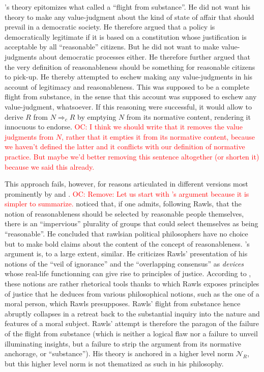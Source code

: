 \documentclass[preprint, french, english, 11pt, authoryear]{elsarticle}%
\newcommand{\commentOC}[1]{\textcolor{red}{OC: #1}}
\begin{document}
\cite{rawls_political_2005}'s theory epitomizes what \cite{estlund_democratic_2009} called a ``flight from substance''. He did not want his theory to make any value-judgment about the kind of state of affair that should prevail in a democratic society. He therefore argued that a policy is democratically legitimate if it is based on a constitution whose justification is acceptable by all  ``reasonable'' citizens. But he did not want to make value-judgments about democratic processes either. He therefore further argued that the very definition of reasonableness should be something for reasonable citizens to pick-up. He thereby attempted to eschew making any value-judgments in his account of legitimacy and reasonableness. This was supposed to be a complete flight from substance, in the sense that this account was supposed to eschew any value-judgment, whatsoever. If this reasoning were successful, it would allow to derive $R$ from $N ⇒_c R$ by emptying $N$ from its normative content, rendering it innocuous to endorse.
\commentOC{I think we should write that it removes the value judgments from $N$, rather that it empties it from its normative content, because we haven’t defined the latter and it conflicts with our definition of normative practice. But maybe we’d better removing this sentence altogether (or shorten it) because we said this already.}

This approach fails, however, for reasons articulated in different versions most prominently by \cite{habermas_reconciliation_1995} and \cite{estlund_democratic_2009}. \commentOC{Remove: Let us start with \cite{estlund_democratic_2009}'s argument because it is simpler to summarize.} \citet{estlund_democratic_2009} noticed that, if one admits, following Rawls, that the notion of reasonableness should be selected by reasonable people themselves, there is an ``impervious'' plurality of groups that could select themselves as being ``reasonable''. He concluded that rawlsian political philosophers have no choice but to make bold claims about the content of the concept of reasonableness. \cite{habermas_reconciliation_1995}'s argument is, to a large extent, similar. He criticizes Rawls' presentation of his notions of the ``veil of ignorance'' and the ``overlapping consensus'' as \emph{devices} whose real-life functionning can give rise to principles of justice. According to \cite{habermas_reconciliation_1995}, these notions are rather rhetorical tools thanks to which Rawls exposes principles of justice that he deduces from various philosophical notions, such as the one of a moral person, which Rawls presupposes. Rawls' flight from substance hence abruptly collapses in a retreat back to the substantial inquiry into the nature and features of a moral subject.  Rawls' attempt is therefore the paragon of the failure of the flight from substance (which is neither a logical flaw nor a failure to unveil illuminating insights, but a failure to strip the argument from its normative anchorage, or ``substance''). His theory is anchored in a higher level norm $\mathscr{N}_R$, but this higher level norm is not thematized as such in his philosophy.
\end{document}
